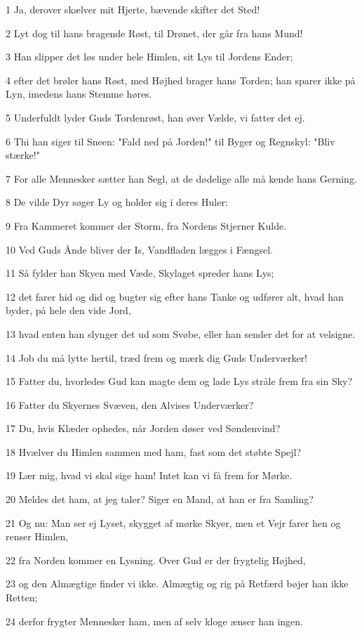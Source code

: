\par 1 Ja, derover skælver mit Hjerte, bævende skifter det Sted!
\par 2 Lyt dog til hans bragende Røst, til Drønet, der går fra hans Mund!
\par 3 Han slipper det løs under hele Himlen, sit Lys til Jordens Ender;
\par 4 efter det brøler hans Røst, med Højhed brager hans Torden; han sparer ikke på Lyn, imedens hans Stemme høres.
\par 5 Underfuldt lyder Guds Tordenrøst, han øver Vælde, vi fatter det ej.
\par 6 Thi han siger til Sneen: "Fald ned på Jorden!" til Byger og Regnskyl: "Bliv stærke!"
\par 7 For alle Mennesker sætter han Segl, at de dødelige alle må kende hans Gerning.
\par 8 De vilde Dyr søger Ly og holder sig i deres Huler:
\par 9 Fra Kammeret kommer der Storm, fra Nordens Stjerner Kulde.
\par 10 Ved Guds Ånde bliver der Is, Vandfladen lægges i Fængsel.
\par 11 Så fylder han Skyen med Væde, Skylaget spreder hans Lys;
\par 12 det farer hid og did og bugter sig efter hans Tanke og udfører alt, hvad han byder, på hele den vide Jord,
\par 13 hvad enten han slynger det ud som Svøbe, eller han sender det for at velsigne.
\par 14 Job du må lytte hertil, træd frem og mærk dig Guds Underværker!
\par 15 Fatter du, hvorledes Gud kan magte dem og lade Lys stråle frem fra sin Sky?
\par 16 Fatter du Skyernes Svæven, den Alvises Underværker?
\par 17 Du, hvis Klæder ophedes, når Jorden døser ved Søndenvind?
\par 18 Hvælver du Himlen sammen med ham, fast som det støbte Spejl?
\par 19 Lær mig, hvad vi skal sige ham! Intet kan vi få frem for Mørke.
\par 20 Meldes det ham, at jeg taler? Siger en Mand, at han er fra Samling?
\par 21 Og nu: Man ser ej Lyset, skygget af mørke Skyer, men et Vejr farer hen og renser Himlen,
\par 22 fra Norden kommer en Lysning. Over Gud er der frygtelig Højhed,
\par 23 og den Almægtige finder vi ikke. Almægtig og rig på Retfærd bøjer han ikke Retten;
\par 24 derfor frygter Mennesker ham, men af selv kloge ænser han ingen.

